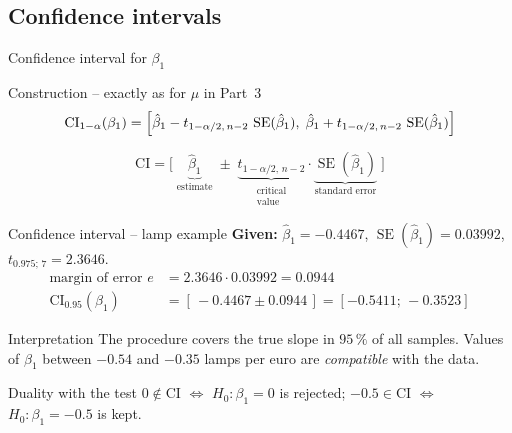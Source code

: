 \documentclass[aspectratio=169,11pt]{beamer}
\begin{document}
\subsection{Confidence intervals}

\begin{frame}{Confidence interval for $\beta_1$}
  \begin{block}{Construction -- exactly as for $\mu$ in Part~3}
    \[
      \text{CI}_{1-\alpha}(\beta_1)
      =\Bigl[\hat\beta_1-t_{1-\alpha/2,\,n-2}\,\operatorname{SE}(\hat\beta_1),\;
             \hat\beta_1+t_{1-\alpha/2,\,n-2}\,\operatorname{SE}(\hat\beta_1)\Bigr]
    \]
  \end{block}
  \[
    \text{CI} = \big[\;\underbrace{\hat\beta_1}_{\text{estimate}}
       \;\pm\; \underbrace{t_{1-\alpha/2,\,n-2}}_{\substack{\text{critical}\\\text{value}}}
       \cdot \underbrace{\operatorname{SE}(\hat\beta_1)}_{\text{standard error}}\;\big]
  \]
\end{frame}

\begin{frame}{Confidence interval -- lamp example}
  \textbf{Given:} $\hat\beta_1=-0.4467$, $\operatorname{SE}(\hat\beta_1)=0.03992$,
  $t_{0.975;\,7}=2.3646$.
  \begin{align*}
    \text{margin of error } e &= 2.3646\cdot 0.03992 = 0.0944\\
    \text{CI}_{0.95}(\beta_1) &= [\,-0.4467\pm0.0944\,]
      = \mathbf{[-0.5411;\,-0.3523]}
  \end{align*}
  \begin{exampleblock}{Interpretation}
    The procedure covers the true slope in $95\,\%$ of all samples. Values
    of $\beta_1$ between $-0.54$ and $-0.35$ lamps per euro are
    \emph{compatible} with the data.
  \end{exampleblock}
  \begin{block}{Duality with the test}
    $0\notin\text{CI}$ $\Leftrightarrow$ $H_0:\beta_1=0$ is rejected;
    \quad $-0.5\in\text{CI}$ $\Leftrightarrow$ $H_0:\beta_1=-0.5$ is kept.
  \end{block}
\end{frame}
\end{document}
